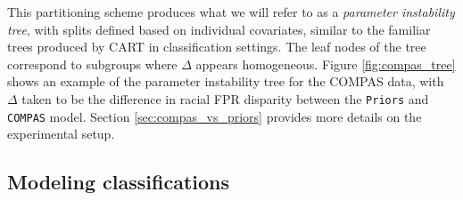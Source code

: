 \documentclass[11pt, sigconf, svgnames]{acmart}
\newcommand{\maxtxt}[1]{\textcolor{blue}{#1}}
\begin{document}
This partitioning scheme produces what we will refer to as a \emph{parameter instability tree}, with splits defined based on individual
covariates, similar to the familiar trees produced by CART
\citep{breiman1984classification} in classification settings.  The leaf nodes
of the tree correspond to subgroups where $\Delta$ appears homogeneous.
Figure \ref{fig:compas_tree} shows an example of the parameter instability tree for the COMPAS data, with $\Delta$ taken to be the difference in racial FPR disparity between the \texttt{Priors} and \texttt{COMPAS} model.  Section \ref{sec:compas_vs_priors} provides more details on the experimental setup.




%






\subsection{Modeling classifications}
\label{sec:model}
\end{document}
